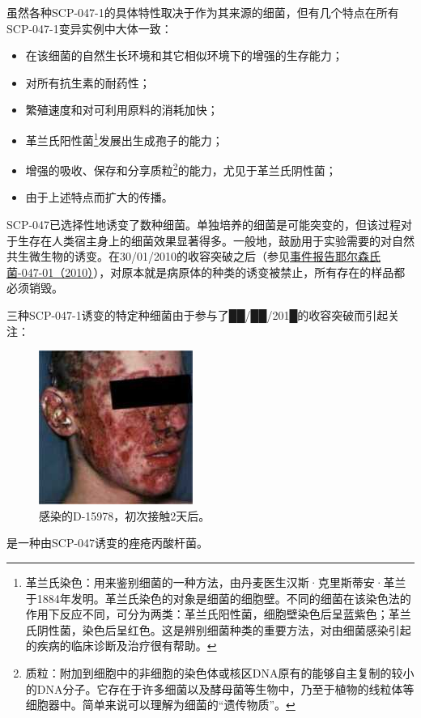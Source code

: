 虽然各种SCP-047-1的具体特性取决于作为其来源的细菌，但有几个特点在所有SCP-047-1变异实例中大体一致：

\begin{itemize}
\item 在该细菌的自然生长环境和其它相似环境下的增强的生存能力；
\item 对所有抗生素的耐药性；
\item 繁殖速度和对可利用原料的消耗加快；
\item 革兰氏阳性菌\footnote{革兰氏染色：用来鉴别细菌的一种方法，由丹麦医生汉斯·克里斯蒂安·革兰于1884年发明。革兰氏染色的对象是细菌的细胞壁。不同的细菌在该染色法的作用下反应不同，可分为两类：革兰氏阳性菌，细胞壁染色后呈蓝紫色；革兰氏阴性菌，染色后呈红色。这是辨别细菌种类的重要方法，对由细菌感染引起的疾病的临床诊断及治疗很有帮助。}发展出生成孢子的能力；
\item 增强的吸收、保存和分享质粒\footnote{质粒：附加到细胞中的非细胞的染色体或核区DNA原有的能够自主复制的较小的DNA分子。它存在于许多细菌以及酵母菌等生物中，乃至于植物的线粒体等细胞器中。简单来说可以理解为细菌的“遗传物质”。}的能力，尤见于革兰氏阴性菌；
\item 由于上述特点而扩大的传播。
\end{itemize}

SCP-047已选择性地诱变了数种细菌。单独培养的细菌是可能突变的，但该过程对于生存在人类宿主身上的细菌效果显著得多。一般地，鼓励用于实验需要的对自然共生微生物的诱变。在30\slash 01\slash 2010的收容突破之后（参见\hyperref[chap:]{事件报告耶尔森氏菌-047-01（2010）}），对原本就是病原体的种类的诱变被禁止，所有存在的样品都必须销毁。

三种SCP-047-1诱变的特定种细菌由于参与了██\slash ██\slash 201█的收容突破而引起关注：



\begin{figure}[H]
    \centering
    \includegraphics[width=0.2\linewidth]{images/SCP.047.2.jpg}
    \caption*{感染的D-15978，初次接触2天后。}
\end{figure}

是一种由SCP-047诱变的痤疮丙酸杆菌。

